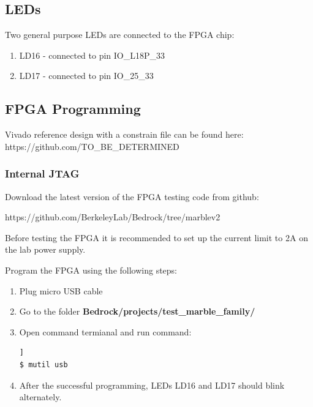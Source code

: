 \documentclass[12pt,oneside,a4]{article}
\begin{document}
\subsection{LEDs}
Two general purpose LEDs are connected to the FPGA chip:
\begin{enumerate}
	\item LD16 - connected to pin IO\_L18P\_33
	\item LD17 - connected to pin IO\_25\_33
\end{enumerate}

\subsection{FPGA Programming}
\begin{leftbar}
Vivado reference design with a constrain file can be found here:
https://github.com/TO\_BE\_DETERMINED
\end{leftbar}

\subsubsection{Internal JTAG}
Download the latest version of the FPGA testing code from github:
\begin{leftbar}
https://github.com/BerkeleyLab/Bedrock/tree/marblev2
\end{leftbar}

\begin{leftbar}
Before testing the FPGA it is recommended to set up the current limit to 2A on the lab power supply. 
\end{leftbar}

Program the FPGA using the following steps:
\begin{enumerate}
	\item Plug micro USB cable
	\item Go to the folder \textbf{Bedrock/projects/test\_marble\_family/}
	\item Open command termianal and run command: 
	\begin{lstlisting}[backgroundcolor = \color{Gainsboro}, language=bash, frame=none]]
$ mutil usb
	\end{lstlisting}
	\item After the successful programming, LEDs LD16 and LD17 should blink alternately.  
\end{enumerate}
\end{document}
